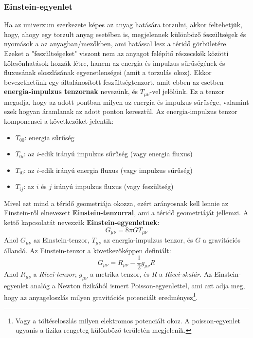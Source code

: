 \documentclass[../main.tex]{subfiles}
\begin{document}
\subsubsection{Einstein-egyenlet}
Ha az univerzum szerkezete képes az anyag hatására torzulni, akkor feltehetjük, hogy, ahogy egy torzult anyag esetében is, megjelennek különböző feszültségek és nyomások a az anyagban/mezőkben, ami hatással lesz a téridő görbületére.
Ezeket a "feszültségeket" viszont nem az anyagot felépítő részecskék közötti kölcsönhatások hozzák létre, hanem az energia és impulzus sűrűségének és fluxusának eloszlásának egyenetlenségei (amit a torzulás okoz).
Ekkor bevezethetünk egy általánosított feszültségtenzort, amit ebben az esetben \textbf{energia-impulzus tenzornak} nevezünk, és $T_{\mu \nu}$-vel jelölünk. Ez a tenzor megadja, hogy az adott pontban milyen az energia és impulzus sűrűsége, valamint ezek hogyan áramlanak
az adott ponton keresztül. Az energia-impulzus tenzor komponensei a következőket jelentik:
\begin{itemize}
    \item $T_{00}$: energia sűrűség
    \item $T_{0i}$: az $i$-edik irányú impulzus sűrűség (vagy energia fluxus)
    \item $T_{i0}$: az $i$-edik irányú energia fluxus (vagy impulzus sűrűség)
    \item $T_{ij}$: az $i$ és $j$ irányú impulzus fluxus (vagy feszültség)
\end{itemize}
Mivel ezt mind a téridő geometriája okozza, ezért arányosnak kell lennie az Einstein-ről elnevezett \textbf{Einstein-tenzorral}, ami a téridő geometriáját jellemzi. A kettő kapcsolatát nevezzük \textbf{Einstein-egyenletnek}:
\begin{equation}
    G_{\mu \nu} = 8 \pi G T_{\mu \nu}
\end{equation}
Ahol $G_{\mu \nu}$ az Einstein-tenzor, $T_{\mu \nu}$ az energia-impulzus tenzor, és $G$ a gravitációs állandó. Az Einstein-tenzor a következőképpen definiált:
\begin{equation}
    G_{\mu \nu} = R_{\mu \nu} - \frac{1}{2} g_{\mu \nu} R
\end{equation}
Ahol $R_{\mu \nu}$ a \textit{Ricci-tenzor}, $g_{\mu \nu}$ a metrika tenzor, és $R$ a \textit{Ricci-skalár}. Az Einstein-egyenlet analóg a Newton fizikából ismert Poisson-egyenlettel,
ami azt adja meg, hogy az anyageloszlás milyen gravitációs potenciált eredményez\footnote{
    Vagy a töltéseloszlás milyen elektromos potenciált okoz. A poisson-egyenlet ugyanis a fizika rengeteg különböző területén megjelenik.
}. 
\end{document}
